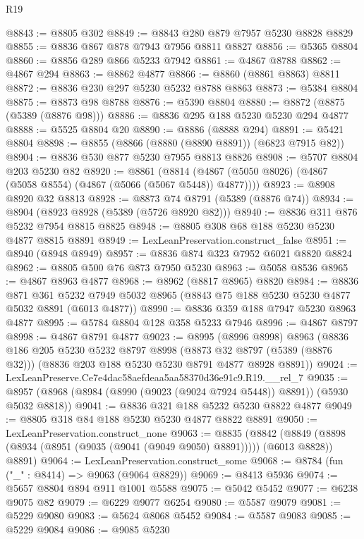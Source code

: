\begin{lexlean}{R19}
\begin{coremodule}
@8843 := @8805 @302
@8849 := @8843 @280 @879 @7957 @5230 @8828 @8829
@8855 := @8836 @867 @878 @7943 @7956 @8811 @8827
@8856 := @5365 @8804
@8860 := @8856 @289 @866 @5233 @7942
@8861 := @4867 @8788
@8862 := @4867 @294
@8863 := @8862 @4877
@8866 := @8860 (@8861 @8863) @8811
@8872 := @8836 @230 @297 @5230 @5232 @8788 @8863
@8873 := @5384 @8804
@8875 := @8873 @98 @8788
@8876 := @5390 @8804
@8880 := @8872 (@8875 (@5389 (@8876 @98)))
@8886 := @8836 @295 @188 @5230 @5230 @294 @4877
@8888 := @5525 @8804 @20
@8890 := @8886 (@8888 @294)
@8891 := @5421 @8804
@8898 := @8855 (@8866 (@8880 (@8890 @8891)) (@6823 @7915 @82))
@8904 := @8836 @530 @877 @5230 @7955 @8813 @8826
@8908 := @5707 @8804 @203 @5230 @82
@8920 := @8861
    (@8814 (@4867 (@5050 @8026) (@4867 (@5058 @8554) (@4867 (@5066 (@5067 @5448)) @4877))))
@8923 := @8908 @8920 @32 @8813
@8928 := @8873 @74 @8791 (@5389 (@8876 @74))
@8934 := @8904 (@8923 @8928 (@5389 (@5726 @8920 @82)))
@8940 := @8836 @311 @876 @5232 @7954 @8815 @8825
@8948 := @8805 @308 @68 @188 @5230 @5230 @4877 @8815 @8891
@8949 := LexLeanPreservation.construct_false
@8951 := @8940 (@8948 @8949)
@8957 := @8836 @874 @323 @7952 @6021 @8820 @8824
@8962 := @8805 @500 @76 @873 @7950 @5230
@8963 := @5058 @8536
@8965 := @4867 @8963 @4877
@8968 := @8962 (@8817 @8965) @8820
@8984 := @8836
    @871
    @361
    @5232
    @7949
    @5032
    @8965
    (@8843 @75 @188 @5230 @5230 @4877 @5032 @8891 (@6013 @4877))
@8990 := @8836 @359 @188 @7947 @5230 @8963 @4877
@8995 := @5784 @8804 @128 @358 @5233 @7946
@8996 := @4867 @8797
@8998 := @4867 @8791 @4877
@9023 := @8995
    (@8996 @8998)
    @8963
    (@8836
      @186
      @205
      @5230
      @5232
      @8797
      @8998
      (@8873 @32 @8797 (@5389 (@8876 @32)))
      (@8836 @203 @188 @5230 @5230 @8791 @4877 @8928 @8891))
@9024 := LexLeanPreserve.Ce7e4dac58aefdeaa5aa58370d36e91c9.R19.__rel_7
@9035 := @8957 (@8968 (@8984 (@8990 (@9023 (@9024 @7924 @5448)) @8891)) (@5930 @5032 @8818))
@9041 := @8836 @321 @188 @5232 @5230 @8822 @4877
@9049 := @8805 @318 @84 @188 @5230 @5230 @4877 @8822 @8891
@9050 := LexLeanPreservation.construct_none
@9063 := @8835
    (@8842 (@8849 (@8898 (@8934 (@8951 (@9035 (@9041 (@9049 @9050) @8891))))) (@6013 @8828)) @8891)
@9064 := LexLeanPreservation.construct_some
@9068 := @8784 (fun ("_" : @8414) => @9063 (@9064 @8829))
@9069 := @8413 @5936
@9074 := @5657 @8804 @894 @911 @1001 @5588
@9075 := @5042 @5452
@9077 := @6238 @9075 @82
@9079 := @6229 @9077 @6254
@9080 := @5587 @9079
@9081 := @5229 @9080
@9083 := @5624 @8068 @5452
@9084 := @5587 @9083
@9085 := @5229 @9084
@9086 := @9085 @5230

\end{coremodule}
\end{lexlean}

